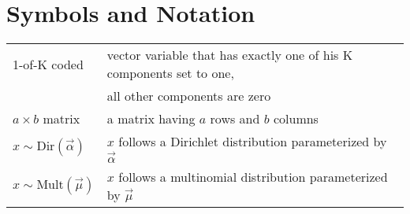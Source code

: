 \section*{Symbols and Notation}

\begin{tabular}{ll}
1-of-K coded & vector variable that has exactly one of his K components set to one,\\ & all other components are zero\\
$a \times b$ matrix & a matrix having $a$ rows and $b$ columns\\
$x \sim \text{Dir}(\vec \alpha)$ & $x$ follows a Dirichlet distribution parameterized by $\vec \alpha$\\
$x \sim \text{Mult}(\vec \mu)$ & $x$ follows a multinomial distribution parameterized by $\vec \mu$
\end{tabular}
